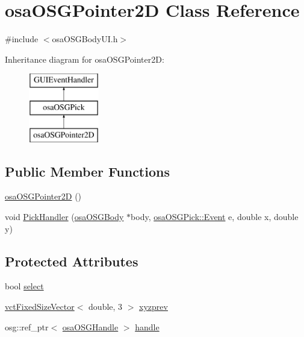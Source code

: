 \hypertarget{classosa_o_s_g_pointer2_d}{}\section{osa\+O\+S\+G\+Pointer2\+D Class Reference}
\label{classosa_o_s_g_pointer2_d}


{\ttfamily \#include $<$osa\+O\+S\+G\+Body\+U\+I.\+h$>$}

Inheritance diagram for osa\+O\+S\+G\+Pointer2\+D\+:\begin{figure}[H]
\begin{center}
\leavevmode
\includegraphics[height=3.000000cm]{d0/db1/classosa_o_s_g_pointer2_d}
\end{center}
\end{figure}
\subsection*{Public Member Functions}
\begin{DoxyCompactItemize}
\item 
\hyperlink{classosa_o_s_g_pointer2_d_aa7d689b5d456cc113d5b48b903eae739}{osa\+O\+S\+G\+Pointer2\+D} ()
\item 
void \hyperlink{classosa_o_s_g_pointer2_d_a23023fdd12565643645cc74436f19150}{Pick\+Handler} (\hyperlink{classosa_o_s_g_body}{osa\+O\+S\+G\+Body} $\ast$body, \hyperlink{classosa_o_s_g_pick_af50ae1a966b6f3282b707d73f87081d8}{osa\+O\+S\+G\+Pick\+::\+Event} e, double x, double y)
\end{DoxyCompactItemize}
\subsection*{Protected Attributes}
\begin{DoxyCompactItemize}
\item 
bool \hyperlink{classosa_o_s_g_pointer2_d_a4f98fd27df2ef100b7bd58673b2578de}{select}
\item 
\hyperlink{classvct_fixed_size_vector}{vct\+Fixed\+Size\+Vector}$<$ double, 3 $>$ \hyperlink{classosa_o_s_g_pointer2_d_a182ee22feed750daa7d6ee2850e39631}{xyzprev}
\item 
osg\+::ref\+\_\+ptr$<$ \hyperlink{classosa_o_s_g_handle}{osa\+O\+S\+G\+Handle} $>$ \hyperlink{classosa_o_s_g_pointer2_d_a84c0eeeb907fe3c630ef982cbe51d34a}{handle}
\end{DoxyCompactItemize}

